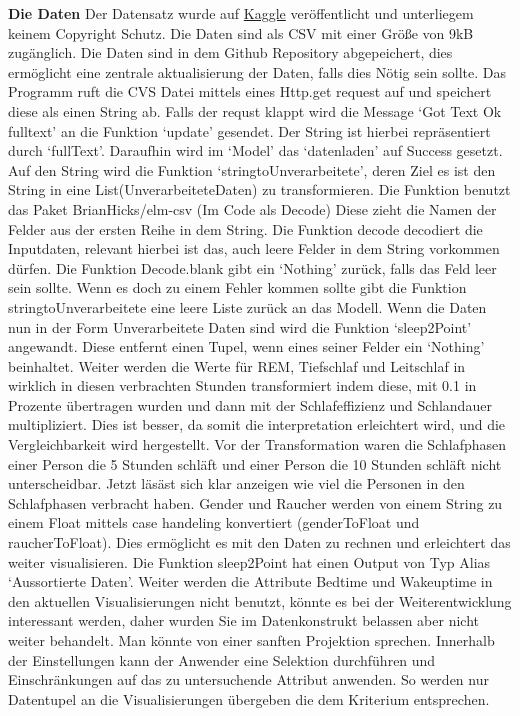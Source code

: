 \documentclass[usegeometry=true]{scrartcl}
\begin{document}
\textbf{ Die Daten }
Der Datensatz wurde auf  \href{https://www.kaggle.com/datasets/equilibriumm/sleep-efficiency/data}{Kaggle} 
veröffentlicht und unterliegem keinem Copyright Schutz. Die Daten sind als CSV mit einer Größe von 9kB zugänglich.
Die Daten sind in dem Github Repository abgepeichert, dies ermöglicht eine zentrale aktualisierung der Daten, falls dies Nötig sein sollte.  
 Das Programm ruft die CVS Datei  mittels eines Http.get request auf und speichert diese als einen String ab.  
Falls der requst klappt wird die Message `Got Text Ok fulltext' an die Funktion `update' gesendet. Der String ist hierbei repräsentiert durch `fullText'.
Daraufhin wird im `Model' das `datenladen' auf Success gesetzt.
 Auf den String wird die Funktion `stringtoUnverarbeitete', deren Ziel es ist den String in eine List(UnverarbeiteteDaten) zu transformieren.
 Die Funktion benutzt das  Paket BrianHicks/elm-csv (Im Code als Decode)  Diese zieht die Namen der Felder aus der ersten Reihe in dem String. Die Funktion decode decodiert die Inputdaten, relevant hierbei ist das, auch leere Felder in dem String vorkommen dürfen. Die Funktion Decode.blank gibt ein  `Nothing' zurück, falls das Feld leer sein sollte.
 Wenn es doch zu einem Fehler kommen sollte gibt die Funktion stringtoUnverarbeitete eine leere Liste zurück an das Modell.
 Wenn die Daten nun in der Form Unverarbeitete Daten sind wird die Funktion `sleep2Point' angewandt. Diese entfernt einen Tupel, wenn eines seiner Felder ein `Nothing' beinhaltet. Weiter werden die Werte für REM, Tiefschlaf und Leitschlaf in wirklich in diesen verbrachten Stunden transformiert indem diese, 
 mit 0.1 in Prozente übertragen wurden und dann mit der Schlafeffizienz und Schlandauer multipliziert.
 Dies ist besser, da somit die interpretation erleichtert wird, und die Vergleichbarkeit wird hergestellt. Vor der Transformation waren die Schlafphasen einer Person die 5 Stunden schläft und einer Person die 10 Stunden schläft nicht unterscheidbar. Jetzt läsäst sich klar anzeigen wie viel die Personen in den Schlafphasen verbracht haben.
 Gender und Raucher werden von einem String zu einem Float mittels case handeling konvertiert (genderToFloat und raucherToFloat). Dies ermöglicht es mit den Daten zu rechnen und erleichtert das weiter visualisieren. 
 Die Funktion sleep2Point hat einen Output von Typ Alias `Aussortierte Daten'.
 Weiter werden die Attribute Bedtime und Wakeuptime in den aktuellen Visualisierungen nicht benutzt, könnte es bei der Weiterentwicklung interessant werden, daher wurden Sie im Datenkonstrukt belassen aber nicht weiter behandelt. Man könnte von einer sanften Projektion sprechen.
 Innerhalb der Einstellungen kann der Anwender eine Selektion durchführen und Einschränkungen auf das zu untersuchende Attribut anwenden.
  So werden nur Datentupel an die Visualisierungen übergeben die dem Kriterium entsprechen.
\end{document}
